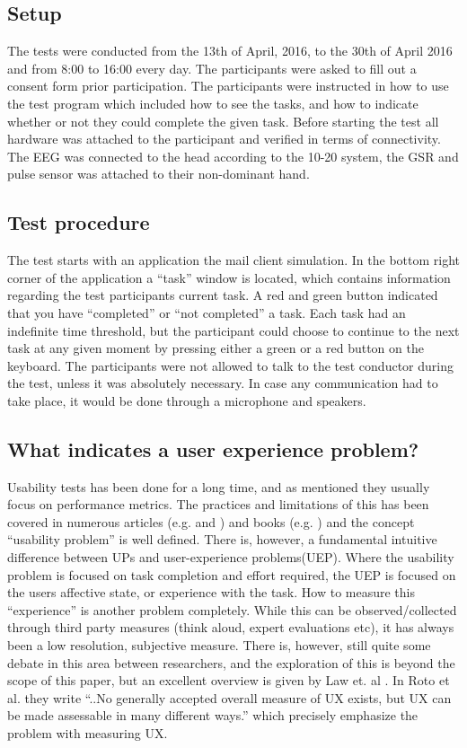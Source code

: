 \subsection{Setup}
The tests were conducted from the 13th of April, 2016, to the 30th of April 2016 and from 8:00 to 16:00 every day. 
The participants were asked to fill out a consent form prior participation. 
The participants were instructed in how to use the test program which included how to see the tasks, and how to indicate whether or not they could complete the given task. 
Before starting the test all hardware was attached to the participant and verified in terms of connectivity. 
The EEG was connected to the head according to the 10-20 system\cite{eeg_tech_10_20}, the GSR and pulse sensor was attached to their non-dominant hand. 

\subsection{Test procedure}
The test starts with an application the mail client simulation.
In the bottom right corner of the application a ``task'' window is located, which contains information regarding the test participants current task. 
A red and green button indicated that you have ``completed'' or ``not completed'' a task.  
Each task had an indefinite time threshold, but the participant could choose to continue to the next task at any given moment by pressing either a green or a red button on the keyboard. 
The participants were not allowed to talk to the test conductor during the test, unless it was absolutely necessary. 
In case any communication had to take place, it would be done through a microphone and speakers.


\subsection{What indicates a user experience problem?}
Usability tests has been done for a long time, and as mentioned they usually focus on performance metrics. 
The practices and limitations of this has been covered in numerous articles (e.g. \cite{usability_eval} and \cite{eval_effect}) and books (e.g. \cite{guide_to_upeval}) and the concept ``usability problem'' is well defined.
There is, however, a fundamental intuitive difference between UPs and user-experience problems(UEP). 
Where the usability problem is focused on task completion and effort required, the UEP is focused on the users affective state, or experience with the task.
How to measure this ``experience'' is another problem completely.
While this can be observed/collected through third party measures (think aloud, expert evaluations etc), it has always been a low resolution, subjective measure. 
There is, however, still quite some debate in this area between researchers, and the exploration of this is beyond the scope of this paper, but an excellent overview is given by Law et. al \cite{attitudes_ux_measure}. 
In Roto et al. \cite{what_is_ux} they write ``..No generally accepted overall measure of UX exists, but UX can be made assessable in many different ways.'' which precisely emphasize the problem with measuring UX. 


